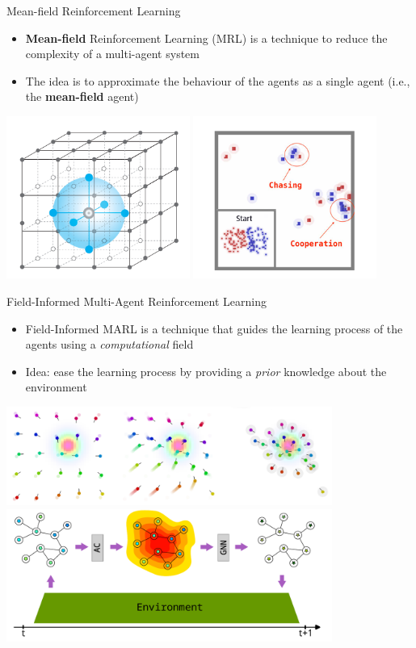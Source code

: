 \documentclass[presentation, 8pt]{beamer}\mode<presentation>{\usetheme{AMSBolognaFC}}
\begin{document}
\begin{frame}{Mean-field Reinforcement Learning}
	\begin{itemize}
		\item \textbf{Mean-field} Reinforcement Learning (MRL) is a technique to reduce the complexity of a multi-agent system
		\item The idea is to approximate the behaviour of the agents as a single agent (i.e., the \textbf{mean-field} agent)
	\end{itemize}
	\centering
	\includegraphics[width=0.45\textwidth]{img/mean-field.png}
	\centering
	\includegraphics[width=0.45\textwidth]{img/result-mean-field.png}
\end{frame}
	\begin{frame}{Field-Informed Multi-Agent Reinforcement Learning}
		\begin{itemize}
			\item Field-Informed MARL is a technique that guides the learning process of the agents using a \emph{computational} field
			\item Idea: ease the learning process by providing a \emph{prior} knowledge about the environment
		\end{itemize}
		\centering
		\includegraphics[width=0.8\textwidth]{img/field-informed.png}
		\centering
		\includegraphics[width=0.8\textwidth]{img/field-informed-schema.png}
	\end{frame}
\end{document}
